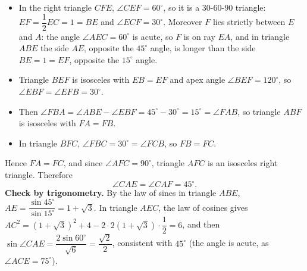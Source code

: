 \begin{itemize}
\item In the right triangle $CFE$, $\angle CEF=60^\circ$, so it is a $30$-$60$-$90$ triangle: $EF=\dfrac{1}{2}EC=1=BE$ and $\angle ECF=30^\circ$. Moreover $F$ lies strictly between $E$ and $A$: the angle $\angle AEC=60^\circ$ is acute, so $F$ is on ray $EA$, and in triangle $ABE$ the side $AE$, opposite the $45^\circ$ angle, is longer than the side $BE=1=EF$, opposite the $15^\circ$ angle.
\item Triangle $BEF$ is isosceles with $EB=EF$ and apex angle $\angle BEF=120^\circ$, so $\angle EBF=\angle EFB=30^\circ$.
\item Then $\angle FBA=\angle ABE-\angle EBF=45^\circ-30^\circ=15^\circ=\angle FAB$, so triangle $ABF$ is isosceles with $FA=FB$.
\item In triangle $BFC$, $\angle FBC=30^\circ=\angle FCB$, so $FB=FC$.
\end{itemize}
Hence $FA=FC$, and since $\angle AFC=90^\circ$, triangle $AFC$ is an isosceles right triangle. Therefore
\[
\angle CAE=\angle CAF=\boxed{45^\circ}.
\]
\textbf{Check by trigonometry.} By the law of sines in triangle $ABE$, $AE=\dfrac{\sin45^\circ}{\sin15^\circ}=1+\sqrt3$. In triangle $AEC$, the law of cosines gives $AC^2=(1+\sqrt3)^2+4-2\cdot2(1+\sqrt3)\cdot\dfrac{1}{2}=6$, and then $\sin\angle CAE=\dfrac{2\sin60^\circ}{\sqrt6}=\dfrac{\sqrt2}{2}$, consistent with $45^\circ$ (the angle is acute, as $\angle ACE=75^\circ$).
